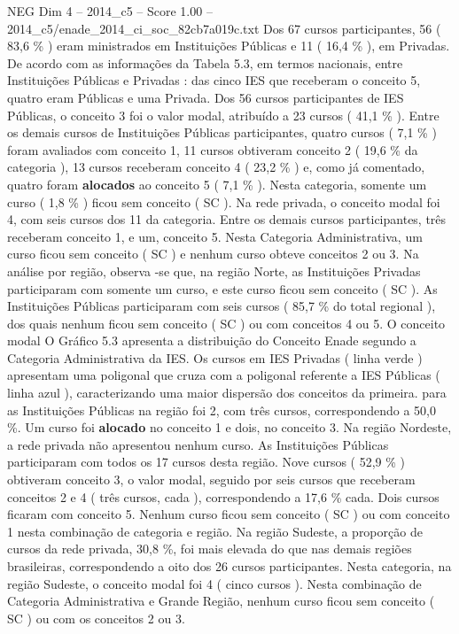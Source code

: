 \begin{textsample}{NEG Dim 4 – 2014\_c5 – Score 1.00 – 2014\_c5/enade\_2014\_ci\_soc\_82cb7a019c.txt}
Dos 67 cursos participantes, 56 ( 83,6 \% ) eram ministrados em Instituições Públicas e 11 ( 16,4 \% ), em Privadas.
De acordo com as informações da Tabela 5.3, em termos nacionais, entre Instituições Públicas e Privadas : das cinco IES que receberam o conceito 5, quatro eram Públicas e uma Privada.
Dos 56 cursos participantes de IES Públicas, o conceito 3 foi o valor modal, atribuído a 23 cursos ( 41,1 \% ).
Entre os demais cursos de Instituições Públicas participantes, quatro cursos ( 7,1 \% ) foram avaliados com conceito 1, 11 cursos obtiveram conceito 2 ( 19,6 \% da categoria ), 13 cursos receberam conceito 4 ( 23,2 \% ) e, como já comentado, quatro foram \textbf{alocados} ao conceito 5 ( 7,1 \% ).
Nesta categoria, somente um curso ( 1,8 \% ) ficou sem conceito ( SC ).
Na rede privada, o conceito modal foi 4, com seis cursos dos 11 da categoria.
Entre os demais cursos participantes, três receberam conceito 1, e um, conceito 5.
Nesta Categoria Administrativa, um curso ficou sem conceito ( SC ) e nenhum curso obteve conceitos 2 ou 3.
Na análise por região, observa -se que, na região Norte, as Instituições Privadas participaram com somente um curso, e este curso ficou sem conceito ( SC ).
As Instituições Públicas participaram com seis cursos ( 85,7 \% do total regional ), dos quais nenhum ficou sem conceito ( SC ) ou com conceitos 4 ou 5.
O conceito modal O Gráfico 5.3 apresenta a distribuição do Conceito Enade segundo a Categoria Administrativa da IES.
Os cursos em IES Privadas ( linha verde ) apresentam uma poligonal que cruza com a poligonal referente a IES Públicas ( linha azul ), caracterizando uma maior dispersão dos conceitos da primeira. para as Instituições Públicas na região foi 2, com três cursos, correspondendo a 50,0 \%.
Um curso foi \textbf{alocado} no conceito 1 e dois, no conceito 3.
Na região Nordeste, a rede privada não apresentou nenhum curso.
As Instituições Públicas participaram com todos os 17 cursos desta região.
Nove cursos ( 52,9 \% ) obtiveram conceito 3, o valor modal, seguido por seis cursos que receberam conceitos 2 e 4 ( três cursos, cada ), correspondendo a 17,6 \% cada.
Dois cursos ficaram com conceito 5.
Nenhum curso ficou sem conceito ( SC ) ou com conceito 1 nesta combinação de categoria e região.
Na região Sudeste, a proporção de cursos da rede privada, 30,8 \%, foi mais elevada do que nas demais regiões brasileiras, correspondendo a oito dos 26 cursos participantes.
Nesta categoria, na região Sudeste, o conceito modal foi 4 ( cinco cursos ).
Nesta combinação de Categoria Administrativa e Grande Região, nenhum curso ficou sem conceito ( SC ) ou com os conceitos 2 ou 3.

\end{textsample}
